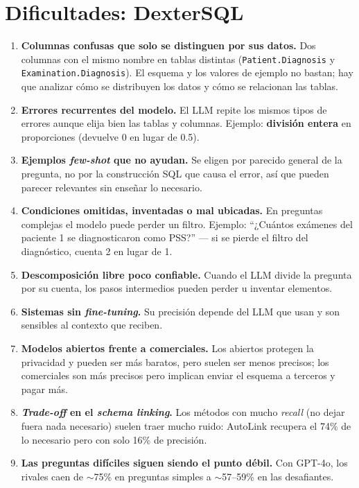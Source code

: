 \documentclass[11pt,a4paper]{article}
\begin{document}
\section{Dificultades: DexterSQL}
\begin{enumerate}
  \item \textbf{Columnas confusas que solo se distinguen por sus datos.} Dos columnas con el mismo nombre en tablas distintas (\texttt{Patient.Diagnosis} y \texttt{Examination.Diagnosis}). El esquema y los valores de ejemplo no bastan; hay que analizar cómo se distribuyen los datos y cómo se relacionan las tablas.
  \item \textbf{Errores recurrentes del modelo.} El LLM repite los mismos tipos de errores aunque elija bien las tablas y columnas. Ejemplo: \textbf{división entera} en proporciones (devuelve 0 en lugar de 0.5).
  \item \textbf{Ejemplos \textit{few-shot} que no ayudan.} Se eligen por parecido general de la pregunta, no por la construcción SQL que causa el error, así que pueden parecer relevantes sin enseñar lo necesario.
  \item \textbf{Condiciones omitidas, inventadas o mal ubicadas.} En preguntas complejas el modelo puede perder un filtro. Ejemplo: ``¿Cuántos exámenes del paciente 1 se diagnosticaron como PSS?'' --- si se pierde el filtro del diagnóstico, cuenta 2 en lugar de 1.
  \item \textbf{Descomposición libre poco confiable.} Cuando el LLM divide la pregunta por su cuenta, los pasos intermedios pueden perder u inventar elementos.
  \item \textbf{Sistemas sin \textit{fine-tuning}.} Su precisión depende del LLM que usan y son sensibles al contexto que reciben.
  \item \textbf{Modelos abiertos frente a comerciales.} Los abiertos protegen la privacidad y pueden ser más baratos, pero suelen ser menos precisos; los comerciales son más precisos pero implican enviar el esquema a terceros y pagar más.
  \item \textbf{\textit{Trade-off} en el \textit{schema linking}.} Los métodos con mucho \textit{recall} (no dejar fuera nada necesario) suelen traer mucho ruido: AutoLink recupera el 74\% de lo necesario pero con solo 16\% de precisión.
  \item \textbf{Las preguntas difíciles siguen siendo el punto débil.} Con GPT-4o, los rivales caen de $\sim$75\% en preguntas simples a $\sim$57--59\% en las desafiantes.
\end{enumerate}
\end{document}
